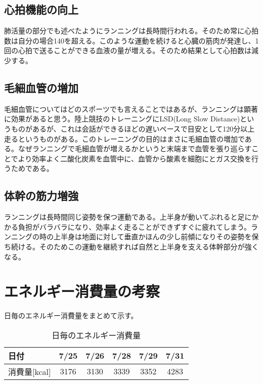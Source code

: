 \documentclass[a4paper,12pt, uplatex, fleqn]{jsarticle}
\begin{document}
    \subsection{心拍機能の向上}
        肺活量の部分でも述べたようにランニングは長時間行われる。そのため常に心拍数は自分の場合140を超える。このような運動を続けると心臓の筋肉が発達し、1回の心拍で送ることができる血液の量が増える。そのため結果として心拍数は減少する。

    \subsection{毛細血管の増加}
        毛細血管についてはどのスポーツでも言えることではあるが、ランニングは顕著に効果があると思う。陸上競技のトレーニングにLSD(Long Slow Distance)というものがあるが、これは会話ができるほどの遅いペースで目安として120分以上走るというものがある。このトレーニングの目的はまさに毛細血管の増加である。なぜランニングで毛細血管が増えるかというと末端まで血管を張り巡らすことでより効率よく二酸化炭素を血管中に、血管から酸素を細胞にとガス交換を行うためである。

    \subsection{体幹の筋力増強}
        ランニングは長時間同じ姿勢を保つ運動である。上半身が動いてぶれると足にかかる負担がバラバラになり、効率よく走ることができずすぐに疲れてしまう。ランニングの時の上半身は地面に対して垂直かほんの少し前傾になりその姿勢を保ち続ける。そのためこの運動を継続すれば自然と上半身を支える体幹部分が強くなる。

\section{エネルギー消費量の考察}
    日毎のエネルギー消費量をまとめて示す。
    \begin{table}[htbp]
        \begin{center}
        \caption{日毎のエネルギー消費量}
            \begin{tabular}{l|ccccc}
                日付 & 7/25 & 7/26 & 7/28 & 7/29 & 7/31 \\ \hline
                消費量[kcal] & 3176 & 3130 & 3339 & 3352 & 4283 \\
            \end{tabular}
        \end{center}
    \end{table}
\end{document}

